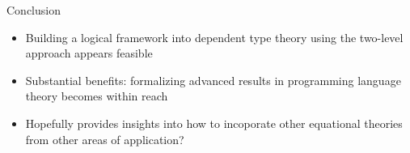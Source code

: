 \documentclass[usenames,dvipsnames]{beamer}
\begin{document}


\begin{frame}{Conclusion}
\begin{itemize}
\item Building a logical framework into dependent type theory using the two-level approach appears feasible
\item Substantial benefits: formalizing advanced results in programming language theory becomes within reach
\item Hopefully provides insights into how to incoporate other equational theories from other areas of application?
\end{itemize}
\end{frame}
\end{document}
